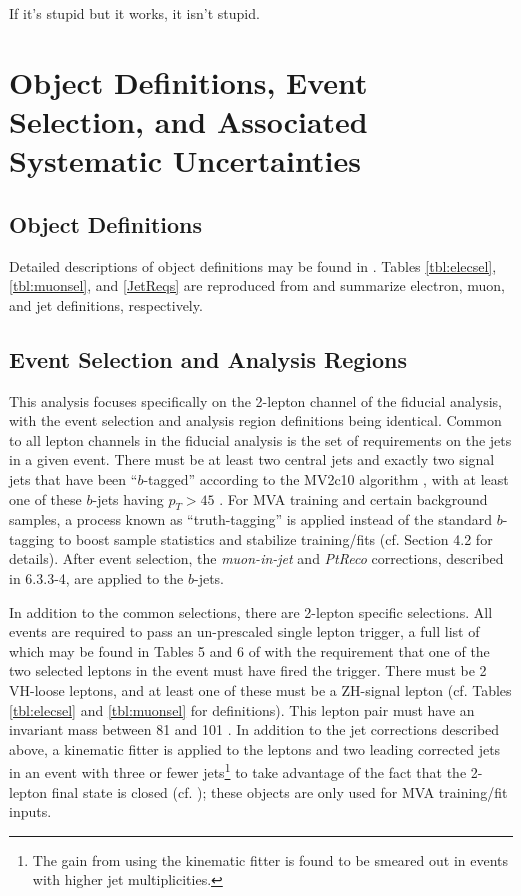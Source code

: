 \begin{savequote}[75mm]
If it's stupid but it works, it isn't stupid.
\end{savequote}

\chapter{Object Definitions, Event Selection, and Associated Systematic Uncertainties}
\label{ch:evsel}

\section{Object Definitions}
Detailed descriptions of object definitions may be found in \cite{objectnote}.  Tables \ref{tbl:elecsel}, \ref{tbl:muonsel}, and \ref{JetReqs} are reproduced from \cite{supportnote} and summarize electron, muon, and jet definitions, respectively.

 

\section{Event Selection and Analysis Regions}
This analysis focuses specifically on the 2-lepton channel of the fiducial analysis, with the event selection and analysis region definitions being identical.  Common to all lepton channels in the fiducial analysis is the set of requirements on the jets in a given event.  There must be at least two central jets and exactly two signal jets that have been ``$b$-tagged'' according to the MV2c10 algorithm \cite{btag}, with at least one of these $b$-jets having $p_T>45$ \GeV.  For MVA training and certain background samples, a process known as ``truth-tagging'' is applied instead of the standard $b$-tagging to boost sample statistics and stabilize training/fits (cf. \cite{supportnote} Section 4.2 for details).  After event selection, the \emph{muon-in-jet} and \emph{PtReco} corrections, described in \cite{objectnote} 6.3.3-4, are applied to the $b$-jets.

In addition to the common selections, there are 2-lepton specific selections.  All events are required to pass an un-prescaled single lepton trigger, a full list of which may be found in Tables 5 and 6 of \cite{objectnote} with the requirement that one of the two selected leptons in the event must have fired the trigger.  There must be 2 VH-loose leptons, and at least one of these must be a ZH-signal lepton (cf. Tables \ref{tbl:elecsel} and \ref{tbl:muonsel} for definitions).  This lepton pair must have an invariant mass between 81 and 101 \GeV.  In addition to the jet corrections described above, a kinematic fitter is applied to the leptons and two leading corrected jets in an event with three or fewer jets\footnote{The gain from using the kinematic fitter is found to be smeared out in events with higher jet multiplicities.} to take advantage of the fact that the 2-lepton final state is closed (cf. \cite{run1note,epsJetRes}); these objects are only used for MVA training/fit inputs.  

